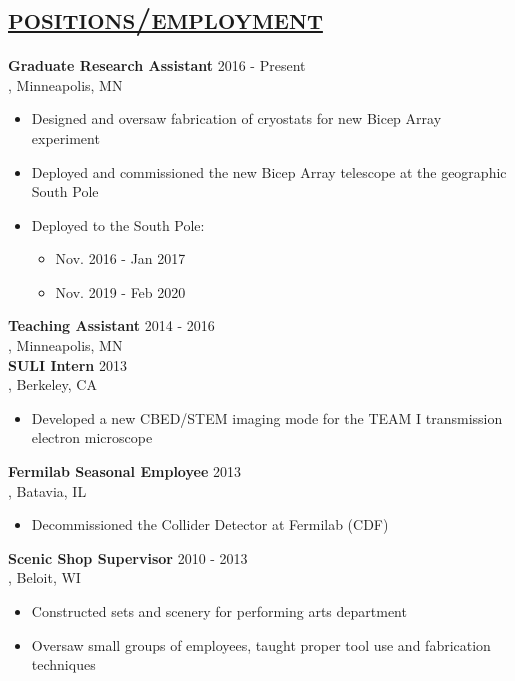 \documentclass[12pt]{article}
\begin{document}
\section*{\Large{\underline{\textsc{positions/employment}}}}
\vspace{0.05in} 
	{\bf Graduate Research Assistant} 2016 - Present  \\
	, Minneapolis, MN\\
	\begin{itemize}
			\vspace{-0.8cm}
		\itemsep=-0.4em
		\item{Designed and oversaw fabrication of cryostats for new Bicep
			Array experiment}
		\item{Deployed and commissioned the new Bicep Array telescope at the
			geographic South Pole}
		\item{Deployed to the South Pole:}
			\begin{itemize}
				\itemsep=-0.4em
					\vspace{-0.3cm}
				\item{Nov. 2016 - Jan 2017}
				\item{Nov. 2019 - Feb 2020}
			\end{itemize}
	\end{itemize}
	\vspace{-0.1in}
	{\bf Teaching Assistant} 2014 - 2016  \\
	, Minneapolis, MN \\
	{\bf SULI Intern} 2013 \\
	, Berkeley, CA
	\begin{itemize}
			\vspace{-0.8em}
		\item{Developed a new CBED/STEM imaging mode for the TEAM I
			transmission electron microscope}
	\end{itemize}
	\vspace{-0.5em}
	{\bf Fermilab Seasonal Employee}  2013 \\
	, Batavia, IL
	\begin{itemize}
			\vspace{-0.8em}
		\item{Decommissioned the Collider Detector at Fermilab (CDF)}
	\end{itemize}
	\vspace{-0.5em}
	{\bf Scenic Shop Supervisor} 2010 - 2013 \\
	, Beloit, WI
	\begin{itemize}
		\itemsep=-0.4em
			\vspace{-0.8em}
		\item{Constructed sets and scenery for performing arts department}
		\item{Oversaw small groups of employees, taught proper tool use and
			fabrication techniques}
	\end{itemize}
\end{document}
